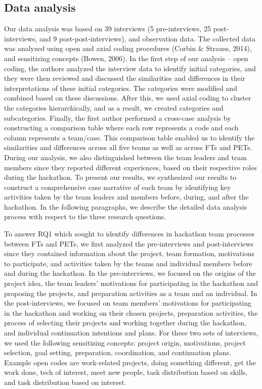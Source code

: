\documentclass{hcij}
\begin{document}
\subsection{Data analysis}
Our data analysis was based on 39 interviews (5 pre-interviews, 25 post-interviews, and 9 post-post-interviews), and observation data. The collected data was analyzed using open and axial coding procedures (Corbin & Strauss, 2014), and sensitizing concepts (Bowen, 2006). In the first step of our analysis – open coding, the authors analyzed the interview data to identify initial categories, and they were then reviewed and discussed the similarities and differences in their interpretations of these initial categories. The categories were modified and combined based on these discussions. After this, we used axial coding to cluster the categories hierarchically, and as a result, we created categories and subcategories. Finally, the first author performed a cross-case analysis by constructing a comparison table where each row represents a code and each column represents a team/case. This comparison table enabled us to identify the similarities and differences across all five teams as well as across FTs and PETs. During our analysis, we also distinguished between the team leaders and team members since they reported different experiences, based on their respective roles during the hackathon. To present our results, we synthesized our results to construct a comprehensive case narrative of each team by identifying key activities taken by the team leaders and members before, during, and after the hackathon. In the following paragraphs, we describe the detailed data analysis process with respect to the three research questions.

To answer RQ1 which sought to identify differences in hackathon team processes between FTs and PETs, we first analyzed the pre-interviews and post-interviews since they contained information about the project, team formation, motivations to participate, and activities taken by the teams and individual members before and during the hackathon. In the pre-interviews, we focused on the origins of the project idea, the team leaders’ motivations for participating in the hackathon and proposing the projects, and preparation activities as a team and an individual. In the post-interviews, we focused on team members’ motivations for participating in the hackathon and working on their chosen projects, preparation activities, the process of selecting their projects and working together during the hackathon, and individual continuation intentions and plans. For these two sets of interviews, we used the following sensitizing concepts: project origin, motivations, project selection, goal setting, preparation, coordination, and continuation plans. Example open codes are work-related projects, doing something different, get the work done, tech of interest, meet new people, task distribution based on skills, and task distribution based on interest.
\end{document}
